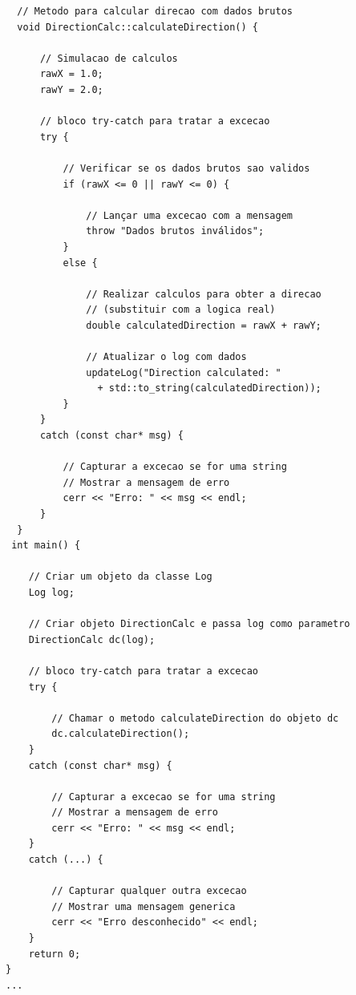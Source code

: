 \documentclass[10pt,twocolumn,letterpaper]{article}
\begin{document}
{\scriptsize
\begin{verbatim}
  // Metodo para calcular direcao com dados brutos
  void DirectionCalc::calculateDirection() {

      // Simulacao de calculos 
      rawX = 1.0;  
      rawY = 2.0;
  
      // bloco try-catch para tratar a excecao
      try {

          // Verificar se os dados brutos sao validos
          if (rawX <= 0 || rawY <= 0) {

              // Lançar uma excecao com a mensagem
              throw "Dados brutos inválidos";
          }
          else {

              // Realizar calculos para obter a direcao
              // (substituir com a logica real)
              double calculatedDirection = rawX + rawY;
  
              // Atualizar o log com dados 
              updateLog("Direction calculated: " 
                + std::to_string(calculatedDirection));
          }
      }
      catch (const char* msg) {
        
          // Capturar a excecao se for uma string
          // Mostrar a mensagem de erro
          cerr << "Erro: " << msg << endl;
      }
  }
 int main() {

    // Criar um objeto da classe Log
    Log log;

    // Criar objeto DirectionCalc e passa log como parametro
    DirectionCalc dc(log);

    // bloco try-catch para tratar a excecao
    try {

        // Chamar o metodo calculateDirection do objeto dc
        dc.calculateDirection();
    }
    catch (const char* msg) {

        // Capturar a excecao se for uma string
        // Mostrar a mensagem de erro
        cerr << "Erro: " << msg << endl;
    }
    catch (...) {

        // Capturar qualquer outra excecao
        // Mostrar uma mensagem generica
        cerr << "Erro desconhecido" << endl;
    }
    return 0;
}
...
\end{verbatim}
}
\end{document}
